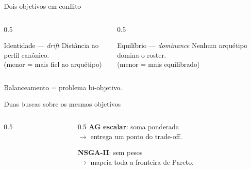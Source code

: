 \documentclass[11pt,aspectratio=169]{beamer}
\begin{document}
\begin{frame}{Dois objetivos em conflito}
  \begin{columns}[t]
  \begin{column}{0.5\textwidth}
    \begin{block}{Identidade --- \emph{drift}}
      Distância ao perfil canônico.\\
      \small (menor = mais fiel ao arquétipo)
    \end{block}
  \end{column}
  \begin{column}{0.5\textwidth}
    \begin{block}{Equilíbrio --- \emph{dominance}}
      Nenhum arquétipo domina o roster.\\
      \small (menor = mais equilibrado)
    \end{block}
  \end{column}
  \end{columns}

  \vfill
  \begin{center}
    \Large Balanceamento = problema \alert{bi-objetivo}.
  \end{center}
\end{frame}

\begin{frame}{Duas buscas sobre os mesmos objetivos}
  \begin{columns}[c]
  \begin{column}{0.5\textwidth}
    \centering
  \end{column}
  \begin{column}{0.5\textwidth}
    \small
    \textbf{AG escalar}: soma ponderada\\
    $\rightarrow$ entrega \alert{um} ponto do trade-off.

    \bigskip
    \textbf{NSGA-II}: sem pesos\\
    $\rightarrow$ mapeia \alert{toda} a fronteira de Pareto.
  \end{column}
  \end{columns}
\end{frame}
\end{document}
